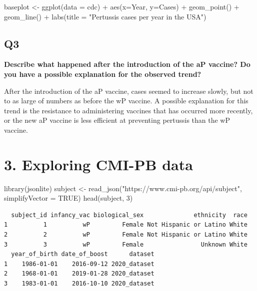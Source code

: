 \documentclass[
  letterpaper,
  DIV=11,
  numbers=noendperiod]{scrartcl}
\newenvironment{Shaded}{\begin{snugshade}}{\end{snugshade}}
\newcommand{\AttributeTok}[1]{\textcolor[rgb]{0.40,0.45,0.13}{#1}}
\newcommand{\ConstantTok}[1]{\textcolor[rgb]{0.56,0.35,0.01}{#1}}
\newcommand{\DecValTok}[1]{\textcolor[rgb]{0.68,0.00,0.00}{#1}}
\newcommand{\FunctionTok}[1]{\textcolor[rgb]{0.28,0.35,0.67}{#1}}
\newcommand{\NormalTok}[1]{\textcolor[rgb]{0.00,0.23,0.31}{#1}}
\newcommand{\OtherTok}[1]{\textcolor[rgb]{0.00,0.23,0.31}{#1}}
\newcommand{\SpecialCharTok}[1]{\textcolor[rgb]{0.37,0.37,0.37}{#1}}
\newcommand{\StringTok}[1]{\textcolor[rgb]{0.13,0.47,0.30}{#1}}
\begin{document}
\begin{Shaded}
\begin{Highlighting}[]
\NormalTok{baseplot }\OtherTok{\textless{}{-}} \FunctionTok{ggplot}\NormalTok{(}\AttributeTok{data =}\NormalTok{ cdc) }\SpecialCharTok{+} \FunctionTok{aes}\NormalTok{(}\AttributeTok{x=}\NormalTok{Year, }\AttributeTok{y=}\NormalTok{Cases) }\SpecialCharTok{+}
  \FunctionTok{geom\_point}\NormalTok{() }\SpecialCharTok{+}
  \FunctionTok{geom\_line}\NormalTok{() }\SpecialCharTok{+}
  \FunctionTok{labs}\NormalTok{(}\AttributeTok{title =} \StringTok{"Pertussis cases per year in the USA"}\NormalTok{)}
\end{Highlighting}
\end{Shaded}

\hypertarget{q3}{%
\subsection{Q3}\label{q3}}

\textbf{Describe what happened after the introduction of the aP vaccine?
Do you have a possible explanation for the observed trend?}

After the introduction of the aP vaccine, cases seemed to increase
slowly, but not to as large of numbers as before the wP vaccine. A
possible explanation for this trend is the resistance to administering
vaccines that has occurred more recently, or the new aP vaccine is less
efficient at preventing pertussis than the wP vaccine.

\hypertarget{exploring-cmi-pb-data}{%
\section{3. Exploring CMI-PB data}\label{exploring-cmi-pb-data}}

\begin{Shaded}
\begin{Highlighting}[]
\FunctionTok{library}\NormalTok{(jsonlite)}
\NormalTok{subject }\OtherTok{\textless{}{-}} \FunctionTok{read\_json}\NormalTok{(}\StringTok{"https://www.cmi{-}pb.org/api/subject"}\NormalTok{, }\AttributeTok{simplifyVector =} \ConstantTok{TRUE}\NormalTok{) }
\FunctionTok{head}\NormalTok{(subject, }\DecValTok{3}\NormalTok{)}
\end{Highlighting}
\end{Shaded}

\begin{verbatim}
  subject_id infancy_vac biological_sex              ethnicity  race
1          1          wP         Female Not Hispanic or Latino White
2          2          wP         Female Not Hispanic or Latino White
3          3          wP         Female                Unknown White
  year_of_birth date_of_boost      dataset
1    1986-01-01    2016-09-12 2020_dataset
2    1968-01-01    2019-01-28 2020_dataset
3    1983-01-01    2016-10-10 2020_dataset
\end{verbatim}
\end{document}
